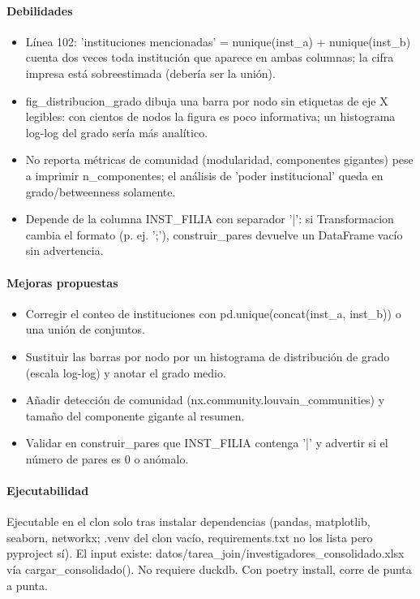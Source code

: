 \paragraph{Debilidades}
\begin{itemize}
  \item Línea 102: 'instituciones mencionadas' = nunique(inst\_a) + nunique(inst\_b) cuenta dos veces toda institución que aparece en ambas columnas; la cifra impresa está sobreestimada (debería ser la unión).
  \item fig\_distribucion\_grado dibuja una barra por nodo sin etiquetas de eje X legibles: con cientos de nodos la figura es poco informativa; un histograma log-log del grado sería más analítico.
  \item No reporta métricas de comunidad (modularidad, componentes gigantes) pese a imprimir n\_componentes; el análisis de 'poder institucional' queda en grado/betweenness solamente.
  \item Depende de la columna INST\_FILIA con separador '|': si Transformacion cambia el formato (p. ej. ';'), construir\_pares devuelve un DataFrame vacío sin advertencia.
\end{itemize}

\paragraph{Mejoras propuestas}
\begin{itemize}
  \item Corregir el conteo de instituciones con pd.unique(concat(inst\_a, inst\_b)) o una unión de conjuntos.
  \item Sustituir las barras por nodo por un histograma de distribución de grado (escala log-log) y anotar el grado medio.
  \item Añadir detección de comunidad (nx.community.louvain\_communities) y tamaño del componente gigante al resumen.
  \item Validar en construir\_pares que INST\_FILIA contenga '|' y advertir si el número de pares es 0 o anómalo.
\end{itemize}

\paragraph{Ejecutabilidad}
Ejecutable en el clon solo tras instalar dependencias (pandas, matplotlib, seaborn, networkx; .venv del clon vacío, requirements.txt no los lista pero pyproject sí). El input existe: datos/tarea\_join/investigadores\_consolidado.xlsx vía cargar\_consolidado(). No requiere duckdb. Con poetry install, corre de punta a punta.

